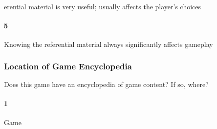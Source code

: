 erential material is very useful; usually affects the player's choices\paragraph{5}Knowing the referential material always significantly affects gameplay\subsubsection{Location of Game Encyclopedia}Does this game have an encyclopedia of game content? If so, where?\paragraph{1}Game